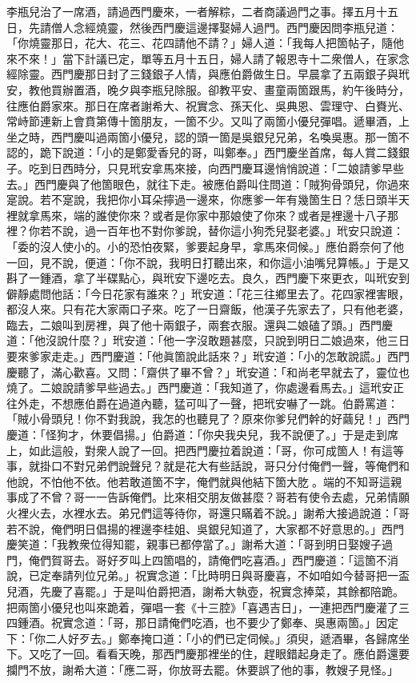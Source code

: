李瓶兒治了一席酒，請過西門慶來，一者解粽，二者商議過門之事。擇五月十五日，先請僧人念經燒靈，然後西門慶這邊擇娶婦人過門。西門慶因問李瓶兒道：「你燒靈那日，花大、花三、花四請他不請？」{}婦人道：「我每人把箇帖子，隨他來不來！」當下計議已定，單等五月十五日，婦人請了報恩寺十二衆僧人，在家念經除靈。西門慶那日封了三錢銀子人情，與應伯爵做生日。早晨拿了五兩銀子與玳安，教他買辦置酒，晚夕與李瓶兒除服。卻教平安、畫童兩箇跟馬，約午後時分，往應伯爵家來。那日在席者謝希大、祝實念、孫天化、吳典恩、雲理守、白賚光、常峙節連新上會賁第傳十箇朋友，一箇不少。{}又叫了兩箇小優兒彈唱。遞畢酒，上坐之時，西門慶叫過兩箇小優兒，認的頭一箇是吳銀兒兄弟，名喚吳惠。那一箇不認的，{}跪下說道：「小的是鄭愛香兒的哥，叫鄭奉。」西門慶坐首席，每人賞二錢銀子。吃到日西時分，只見玳安拿馬來接，向西門慶耳邊悄悄說道：「二娘請爹早些去。」西門慶與了他箇眼色，就往下走。{}被應伯爵叫住問道：「賊狗骨頭兒，你過來寔說。若不寔說，我把你小耳朵擰過一邊來，你應爹一年有幾箇生日？恁日頭半天裡就拿馬來，端的誰使你來？或者是你家中那娘使了你來？或者是裡邊十八子那裡？你若不說，過一百年也不對你爹說，替你這小狗禿兒娶老婆。」玳安只說道：「委的沒人使小的。小的恐怕夜緊，爹要起身早，拿馬來伺候。」應伯爵奈何了他一回，見不說，便道：「你不說，我明日打聽出來，和你這小油嘴兒算帳。」于是又斟了一鍾酒，拿了半碟點心，與玳安下邊吃去。良久，西門慶下來更衣，叫玳安到僻靜處問他話：「今日花家有誰來？」{}玳安道：「花三往鄉里去了。花四家裡害眼，都沒人來。只有花大家兩口子來。吃了一日齋飯，他漢子先家去了，只有他老婆，臨去，二娘叫到房裡，與了他十兩銀子，兩套衣服。還與二娘磕了頭。」西門慶道：「他沒說什麼？」玳安道：「他一字沒敢題甚麼，只說到明日二娘過來，他三日要來爹家走走。」西門慶道：「他眞箇說此話來？」{}玳安道：「小的怎敢說謊。」西門慶聽了，滿心歡喜。又問：「齋供了畢不曾？」玳安道：「和尚老早就去了，靈位也燒了。二娘說請爹早些過去。」西門慶道：「我知道了，你處邊看馬去。」這玳安正往外走，不想應伯爵在過道內聽，猛可叫了一聲，把玳安嚇了一跳。伯爵罵道：「賊小骨頭兒！你不對我說，我怎的也聽見了？原來你爹兒們幹的好繭兒！」西門慶道：「怪狗才，休要倡揚。」伯爵道：「你央我央兒，我不說便了。」于是走到席上，如此這般，對衆人說了一回。把西門慶拉着說道：「哥，你可成箇人！有這等事，就掛口不對兄弟們說聲兒？就是花大有些話說，哥只分付俺們一聲，等俺們和他說，不怕他不依。他若敢道箇不字，俺們就與他結下箇大肐𦞂。端的不知哥這親事成了不曾？哥一一告訴俺們。比來相交朋友做甚麼？哥若有使令去處，兄弟情願火裡火去，水裡水去。弟兄們這等待你，哥還只瞞着不說。」{}謝希大接過說道：「哥若不說，俺們明日倡揚的裡邊李桂姐、吳銀兒知道了，大家都不好意思的。」西門慶笑道：「我教衆位得知罷，親事已都停當了。」謝希大道：「哥到明日娶嫂子過門，俺們賀哥去。哥好歹叫上四箇唱的，請俺們吃喜酒。」西門慶道：「這箇不消說，已定奉請列位兄弟。」祝實念道：「比時明日與哥慶喜，不如咱如今替哥把一盃兒酒，先慶了喜罷。」{}于是叫伯爵把酒，謝希大執壺，祝實念捧菜，其餘都陪跪。把兩箇小優兒也叫來跪着，彈唱一套《十三腔》「喜遇吉日」，一連把西門慶灌了三四鍾酒。祝實念道：「哥，那日請俺們吃酒，也不要少了鄭奉、吳惠兩箇。」因定下：「你二人好歹去。」鄭奉掩口道：「小的們已定伺候。」須臾，遞酒畢，各歸席坐下。又吃了一回。看看天晚，那西門慶那裡坐的住，趕眼錯起身走了。應伯爵還要攔門不放，謝希大道：「應二哥，你放哥去罷。休要誤了他的事，教嫂子見怪。」

